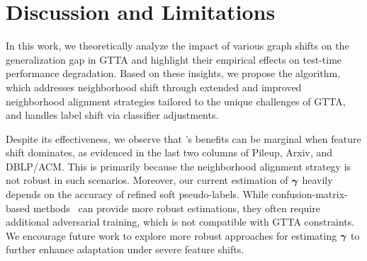 \section{Discussion and Limitations}
In this work, we theoretically analyze the impact of various graph shifts on the generalization gap in GTTA and highlight their empirical effects on test-time performance degradation. Based on these insights, we propose the \proj algorithm, which addresses neighborhood shift through extended and improved neighborhood alignment strategies tailored to the unique challenges of GTTA, and handles label shift via classifier adjustments. %

Despite its effectiveness, we observe that \proj’s benefits can be marginal when feature shift dominates, as evidenced in the last two columns of Pileup, Arxiv, and DBLP/ACM. This is primarily because the neighborhood alignment strategy is not robust in such scenarios. Moreover, our current estimation of $\boldsymbol{\gamma}$ heavily depends on the accuracy of refined soft pseudo-labels. While confusion-matrix-based methods~\cite{lipton2018detecting, azizzadenesheli2019regularized, alexandari2020maximum} can provide more robust estimations, they often require additional adversarial training, which is not compatible with GTTA constraints. We encourage future work to explore more robust approaches for estimating $\boldsymbol{\gamma}$ to further enhance adaptation under severe feature shifts.










